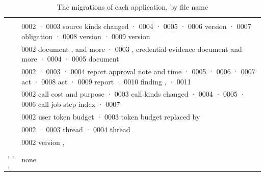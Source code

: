 \begin{xltabular}{\textwidth}{@{}L{20mm}Y@{}}
\caption{The migrations of each application, by file name}\label{tab:data:migrations}\\
\toprule
{} &  \\
\midrule
\endfirsthead
\toprule
{} &  \\
\midrule
\endhead
\bottomrule
\endlastfoot
{} & 0002  · 0003 source kinds changed · 0004  · 0005  · 0006 version  · 0007 obligation  · 0008 version  · 0009 version  \\
 & 0002 document ,  and more · 0003 , credential evidence document and more · 0004  · 0005 document  \\
 & 0002  · 0003  · 0004 report approval note and time · 0005  · 0006  · 0007 act  · 0008 act  · 0009 report  · 0010 finding ,  · 0011  \\
 & 0002 call cost and purpose · 0003 call kinds changed · 0004  · 0005  · 0006 call job-step index · 0007  \\
 & 0002 user token budget · 0003 token budget replaced by  \\
 & 0002  · 0003 thread  · 0004 thread  \\
 & 0002 version ,  \\
, , ,  & none \\
\end{xltabular}
